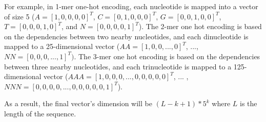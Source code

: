 For example, in 1-mer one-hot encoding, each nucleotide is mapped into a vector of size 5 ($A = [1, 0, 0, 0, 0]^{T}$, $C = [0, 1, 0, 0, 0]^{T}$, $G = [0, 0, 1, 0 ,0]^{T}$, $T = [0, 0, 0, 1, 0]^{T}$, and $N = [0, 0, 0, 0, 1]^{T}$). The 2-mer one hot encoding is based on the dependencies between two nearby nucleotides, and each dinucleotide is mapped to a 25-dimensional vector ($AA = [1, 0, 0, ..., 0]^{T}$, ..., $NN = [0, 0, 0, ..., 1]^{T})$. The 3-mer one hot encoding is based on the dependencies between three nearby nucleotides, and each trinucleotide is mapped to a 125-dimensional vector ($AAA = [1, 0, 0, 0, ..., 0, 0, 0, 0, 0]^{T}$, ... , $NNN = [0, 0, 0, 0, ..., 0, 0, 0, 0, 0, 1]^{T}$).

As a result, the final vector's dimension will be $(L - k + 1) * 5^{k}$ where $L$ is the length of the sequence.